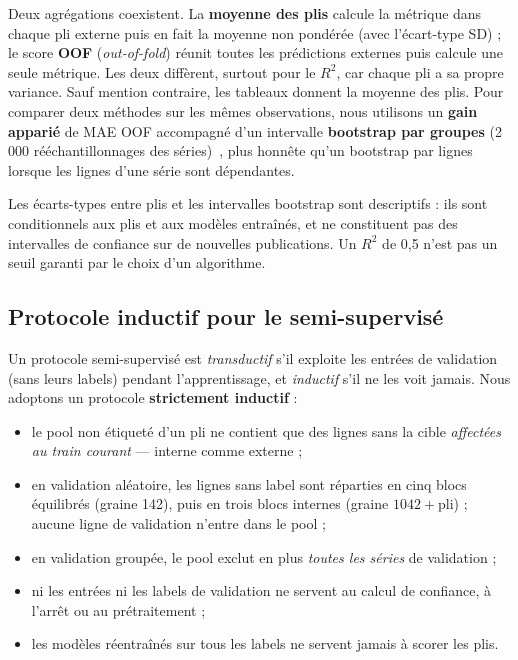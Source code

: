 Deux agrégations coexistent. La \textbf{moyenne des plis} calcule la métrique dans
chaque pli externe puis en fait la moyenne non pondérée (avec l'écart-type SD) ;
le score \textbf{OOF} (\emph{out-of-fold}) réunit toutes les prédictions externes
puis calcule une seule métrique. Les deux diffèrent, surtout pour le $R^2$, car
chaque pli a sa propre variance. Sauf mention contraire, les tableaux donnent la
moyenne des plis. Pour comparer deux méthodes sur les mêmes observations, nous
utilisons un \textbf{gain apparié} de MAE OOF accompagné d'un intervalle
\textbf{bootstrap par groupes} (2\,000 rééchantillonnages des séries)~\cite{efron_tibshirani_1993},
plus honnête qu'un bootstrap par lignes lorsque les lignes d'une série sont dépendantes.

\begin{precaution}
Les écarts-types entre plis et les intervalles bootstrap sont descriptifs : ils
sont conditionnels aux plis et aux modèles entraînés, et ne constituent pas des
intervalles de confiance sur de nouvelles publications. Un $R^2$ de 0,5 n'est
pas un seuil garanti par le choix d'un algorithme.
\end{precaution}

\subsection{Protocole inductif pour le semi-supervisé}
\label{subsec:inductif}

Un protocole semi-supervisé est \emph{transductif} s'il exploite les entrées de
validation (sans leurs labels) pendant l'apprentissage, et \emph{inductif} s'il
ne les voit jamais. Nous adoptons un protocole \textbf{strictement inductif} :
\begin{itemize}
  \item le pool non étiqueté d'un pli ne contient que des lignes sans la cible \emph{affectées au train courant} --- interne comme externe ;
  \item en validation aléatoire, les lignes sans label sont réparties en cinq blocs équilibrés (graine 142), puis en trois blocs internes (graine $1042 + \text{pli}$) ; aucune ligne de validation n'entre dans le pool ;
  \item en validation groupée, le pool exclut en plus \emph{toutes les séries} de validation ;
  \item ni les entrées ni les labels de validation ne servent au calcul de confiance, à l'arrêt ou au prétraitement ;
  \item les modèles réentraînés sur tous les labels ne servent jamais à scorer les plis.
\end{itemize}

